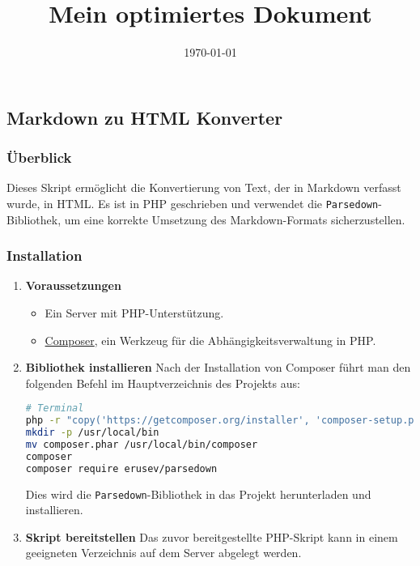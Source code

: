 \documentclass[12pt,a4paper]{scrartcl}
\title{Mein optimiertes Dokument}
\date{\today}
\newcommand{\tightlist}{
  \setlength{\itemsep}{0pt}\setlength{\parskip}{0pt}
}
\begin{document}
\maketitle

\hypertarget{markdown-zu-html-konverter}{%
\subsection{Markdown zu HTML
Konverter}\label{markdown-zu-html-konverter}}

\hypertarget{uxfcberblick}{%
\subsubsection{Überblick}\label{uxfcberblick}}

Dieses Skript ermöglicht die Konvertierung von Text, der in Markdown
verfasst wurde, in HTML. Es ist in PHP geschrieben und verwendet die
{\lstinline!Parsedown!}-Bibliothek, um eine korrekte
Umsetzung des Markdown-Formats sicherzustellen.

\hypertarget{installation}{%
\subsubsection{Installation}\label{installation}}

\begin{enumerate}
\def\labelenumi{\arabic{enumi}.}
\item
  \textbf{Voraussetzungen}

  \begin{itemize}
  \tightlist
  \item
    Ein Server mit PHP-Unterstützung.
  \item
    \href{https://getcomposer.org/}{Composer}, ein Werkzeug für die
    Abhängigkeitsverwaltung in PHP.
  \end{itemize}
\item
  \textbf{Bibliothek installieren} Nach der Installation von Composer
  führt man den folgenden Befehl im Hauptverzeichnis des Projekts aus:

\begin{lstlisting}[language=bash]
# Terminal
php -r "copy('https://getcomposer.org/installer', 'composer-setup.php');"
mkdir -p /usr/local/bin
mv composer.phar /usr/local/bin/composer
composer
composer require erusev/parsedown
\end{lstlisting}

  Dies wird die {\lstinline!Parsedown!}-Bibliothek in das
  Projekt herunterladen und installieren.
\item
  \textbf{Skript bereitstellen} Das zuvor bereitgestellte PHP-Skript
  kann in einem geeigneten Verzeichnis auf dem Server abgelegt werden.
\end{enumerate}
\end{document}
